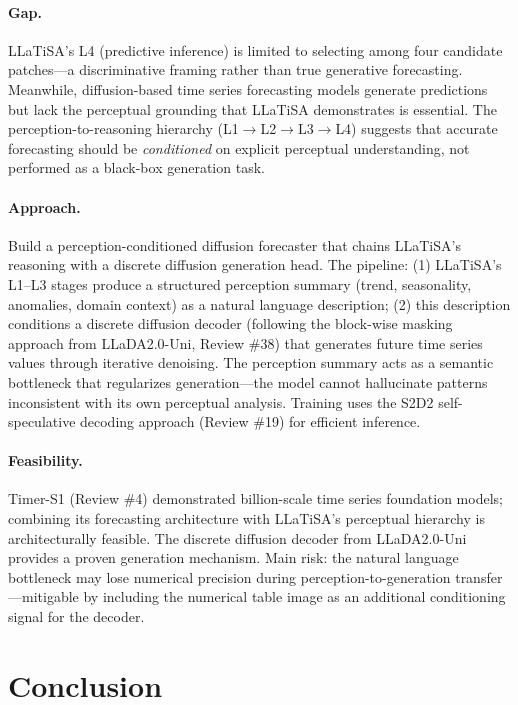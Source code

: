 \documentclass[11pt]{article}
\begin{document}
\paragraph{Gap.}
LLaTiSA's L4 (predictive inference) is limited to selecting among four candidate patches---a discriminative framing rather than true generative forecasting. Meanwhile, diffusion-based time series forecasting models generate predictions but lack the perceptual grounding that LLaTiSA demonstrates is essential. The perception-to-reasoning hierarchy (L1$\to$L2$\to$L3$\to$L4) suggests that accurate forecasting should be \emph{conditioned} on explicit perceptual understanding, not performed as a black-box generation task.

\paragraph{Approach.}
Build a perception-conditioned diffusion forecaster that chains LLaTiSA's reasoning with a discrete diffusion generation head. The pipeline: (1) LLaTiSA's L1--L3 stages produce a structured perception summary (trend, seasonality, anomalies, domain context) as a natural language description; (2) this description conditions a discrete diffusion decoder (following the block-wise masking approach from LLaDA2.0-Uni, Review \#38) that generates future time series values through iterative denoising. The perception summary acts as a semantic bottleneck that regularizes generation---the model cannot hallucinate patterns inconsistent with its own perceptual analysis. Training uses the S2D2 self-speculative decoding approach (Review \#19) for efficient inference.

\paragraph{Feasibility.}
Timer-S1 (Review \#4) demonstrated billion-scale time series foundation models; combining its forecasting architecture with LLaTiSA's perceptual hierarchy is architecturally feasible. The discrete diffusion decoder from LLaDA2.0-Uni provides a proven generation mechanism. Main risk: the natural language bottleneck may lose numerical precision during perception-to-generation transfer---mitigable by including the numerical table image as an additional conditioning signal for the decoder.

\section{Conclusion}
\end{document}
